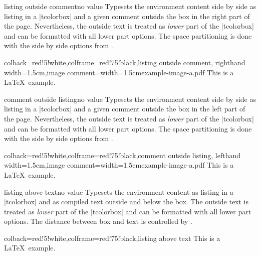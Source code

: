 \begin{docTcbKey}{listing outside comment}{}{no value}
Typesets the environment content side by side as listing in a |tcolorbox|
and a given comment outside the box in the right part of the page.
Nevertheless, the outside text is treated as \emph{lower} part of the
|tcolorbox| and can be formatted with all lower part options.
The space partitioning is done with the side by side options from
.
\begin{dispExample}
\begin{tcblisting}{colback=red!5!white,colframe=red!75!black,listing outside comment,
  righthand width=1.5cm,image comment={width=1.5cm}{example-image-a.pdf}}
This is a \LaTeX\ example.
\end{tcblisting}
\end{dispExample}
\end{docTcbKey}


\begin{docTcbKey}{comment outside listing}{}{no value}
Typesets the environment content side by side as listing in a |tcolorbox|
and a given comment outside the box in the left part of the page.
Nevertheless, the outside text is treated as \emph{lower} part of the
|tcolorbox| and can be formatted with all lower part options.
The space partitioning is done with the side by side options from
.
\begin{dispExample}
\begin{tcblisting}{colback=red!5!white,colframe=red!75!black,comment outside listing,
  lefthand width=1.5cm,image comment={width=1.5cm}{example-image-a.pdf}}
This is a \LaTeX\ example.
\end{tcblisting}
\end{dispExample}
\end{docTcbKey}



\begin{docTcbKey}{listing above text}{}{no value}
  Typesets the environment content as listing in a |tcolorbox|
  and as compiled text outside and below the box.
  The outside text is treated as \emph{lower} part of the
  |tcolorbox| and can be formatted with all lower part options.
  The distance between box and text is controlled by .
\begin{dispExample}
\begin{tcblisting}{colback=red!5!white,colframe=red!75!black,listing above text}
This is a \LaTeX\ example.
\end{tcblisting}
\end{dispExample}
\end{docTcbKey}


